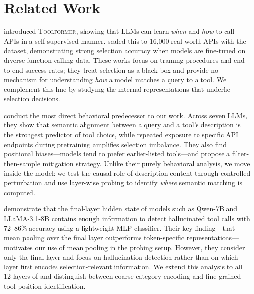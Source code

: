 \section{Related Work}
\label{sec:related}

\citet{schick2023toolformer} introduced \textsc{Toolformer}, showing that LLMs can learn
\emph{when} and \emph{how} to call APIs in a self-supervised manner.  \citet{qin2023toolllm}
scaled this to 16{,}000 real-world APIs with the \toolbench dataset, demonstrating strong
selection accuracy when models are fine-tuned on diverse function-calling data.  These
works focus on training procedures and end-to-end success rates; they treat selection as a
black box and provide no mechanism for understanding \emph{how} a model matches a query to
a tool.  We complement this line by studying the internal representations that underlie
selection decisions.

\citet{blankenstein2025biasbust} conduct the most direct behavioral predecessor to our
work.  Across seven LLMs, they show that semantic alignment between a query and a tool's
description is the strongest predictor of tool choice, while repeated exposure to specific
API endpoints during pretraining amplifies selection imbalance.  They also find positional
biases---models tend to prefer earlier-listed tools---and propose a
filter-then-sample mitigation strategy.  Unlike their purely behavioral analysis, we move
inside the model: we test the causal role of description content through controlled
perturbation and use layer-wise probing to identify \emph{where} semantic matching is
computed.

\citet{healy2026internal} demonstrate that the final-layer hidden state of models such as
Qwen-7B and LLaMA-3.1-8B contains enough information to detect hallucinated tool calls
with 72--86\% accuracy using a lightweight MLP classifier.  Their key finding---that mean
pooling over the final layer outperforms token-specific representations---motivates our
use of mean pooling in the probing setup.  However, they consider only the final layer and
focus on hallucination detection rather than on which layer first encodes selection-relevant
information.  We extend this analysis to all 12 layers of \gpttwo and distinguish between
coarse category encoding and fine-grained tool position identification.

